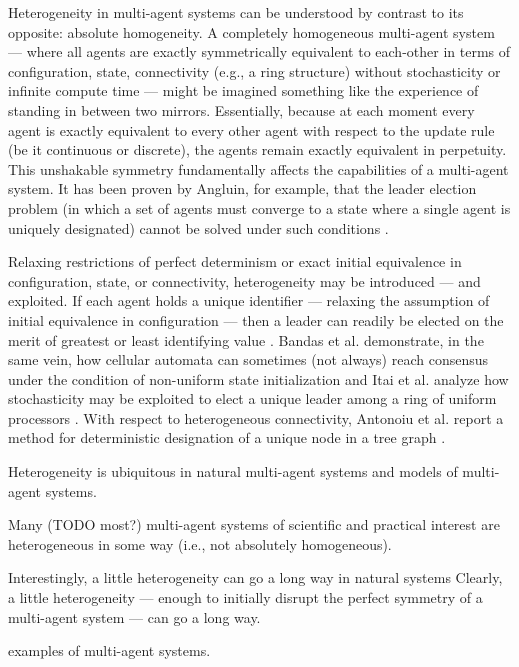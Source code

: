 Heterogeneity in multi-agent systems can be understood by contrast to its opposite: absolute homogeneity.
A completely homogeneous multi-agent system --- where all agents are exactly symmetrically equivalent to each-other in terms of configuration, state, connectivity (e.g., a ring structure) without stochasticity or infinite compute time --- might be imagined something like the experience of standing in between two mirrors.
Essentially, because at each moment every agent is exactly equivalent to every other agent with respect to the update rule (be it continuous or discrete), the agents remain exactly equivalent in perpetuity.
This unshakable symmetry fundamentally affects the capabilities of a multi-agent system.
It has been proven by Angluin, for example, that the leader election problem (in which a set of agents must converge to a state where a single agent is uniquely designated) cannot be solved under such conditions \cite{angluin1980local,banda2015configuration}.

Relaxing restrictions of perfect determinism or exact initial equivalence in configuration, state, or connectivity, heterogeneity may be introduced --- and exploited.
If each agent holds a unique identifier --- relaxing the assumption of initial equivalence in configuration --- then a leader can readily be elected on the merit of greatest or least identifying value \cite{frederickson1987electing}.
Bandas et al. demonstrate, in the same vein, how cellular automata can sometimes (not always) reach consensus under the condition of non-uniform state initialization \cite{banda2015configuration} and Itai et al. analyze how stochasticity may be exploited to elect a unique leader among a ring of uniform processors \cite{itai1981symmetry}.
With respect to heterogeneous connectivity, Antonoiu et al. report a method for deterministic designation of a unique node in a tree graph \cite{antonoiu1996self}.


Heterogeneity is ubiquitous in natural multi-agent systems and models of multi-agent systems.

Many (TODO most?) multi-agent systems of scientific and practical interest are heterogeneous in some way (i.e., not absolutely homogeneous).

Interestingly, a little heterogeneity can go a long way in natural systems
Clearly, a little heterogeneity --- enough to initially disrupt the perfect symmetry of a multi-agent system --- can go a long way.

examples of multi-agent systems.


